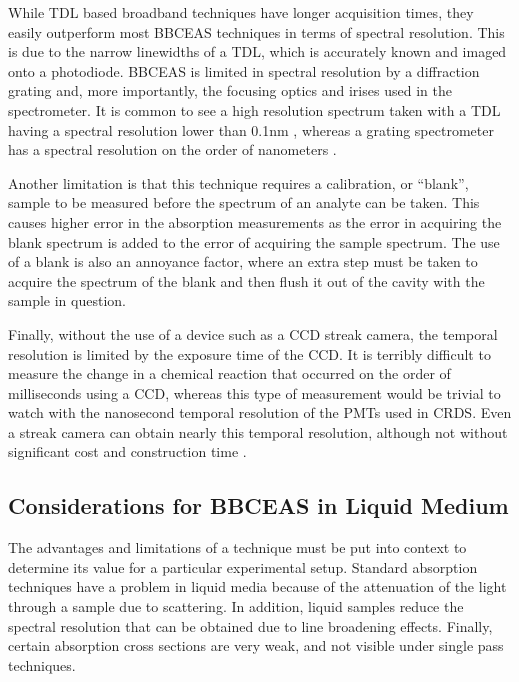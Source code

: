 
While \ac{TDL} based broadband techniques have longer acquisition times,
they easily outperform most \ac{BBCEAS} techniques in terms of spectral
resolution. This is due to the narrow linewidths of a \ac{TDL}, which is
accurately known and imaged onto a photodiode. \ac{BBCEAS} is limited in
spectral resolution by a diffraction grating and, more importantly, the
focusing optics and irises used in the spectrometer. It is common to see a
high resolution spectrum taken with a \ac{TDL} having a spectral resolution
lower than 0.1nm \cite{Wieman:2000vd}, whereas a grating spectrometer has a
spectral resolution on the order of nanometers \cite{Kiwanuka:2010bj}.

Another limitation is that this technique requires a calibration, or ``blank'',
sample to be measured before the spectrum of an analyte can be taken. This
causes higher error in the absorption measurements as the error in acquiring
the blank spectrum is added to the error of acquiring the sample spectrum. The
use of a blank is also an annoyance factor, where an extra step must be taken
to acquire the spectrum of the blank and then flush it out of the cavity with
the sample in question.

Finally, without the use of a device such as a \ac{CCD} streak camera, the
temporal resolution is limited by the exposure time of the \ac{CCD}. It is
terribly difficult to measure the change in a chemical reaction that occurred
on the order of milliseconds using a \ac{CCD}, whereas this type of measurement
would be trivial to watch with the nanosecond temporal resolution of the
\acp{PMT} used in \ac{CRDS}. Even a streak camera can obtain nearly this
temporal resolution, although not without significant cost and construction
time \cite{Velten:2011vq}.



\subsection{Considerations for BBCEAS in Liquid Medium}\label{subsec:bbceas_liq}

The advantages and limitations of a technique must be put into context to
determine its value for a particular experimental setup. Standard absorption
techniques have a problem in liquid media because of the attenuation of the
light through a sample due to scattering. In addition, liquid samples reduce
the spectral resolution that can be obtained due to line broadening effects. Finally, certain absorption cross sections are very weak, and not visible under single pass techniques.

